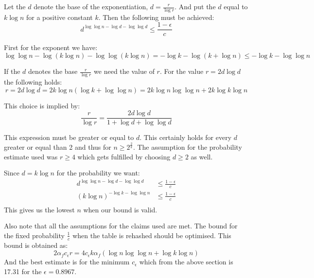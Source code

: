 Let the $d$ denote the base of the exponentiation, $d = \frac{r}{\log r}$. And put the $d$ equal to $k \log n$ for a positive constant $k$. Then the following must be achieved:
\begin{displaymath}
d ^ {\log \log n - \log d -\log \log d} \leq \frac{1 - \epsilon}{c}
\end{displaymath}

First for the exponent we have:
\begin{displaymath}
\log \log n - \log (k \log n) - \log \log (k \log n) = - \log k - \log (k + \log n) \leq -\log k - \log \log n
\end{displaymath}

If the $d$ denotes the base $\frac{r}{\log r}$ we need the value of $r$. For the value $r = 2 d \log d$ the following holds:
\begin{displaymath}
r = 2 d \log d = 2 k \log n (\log k + \log \log n) = 2 k \log n \log \log n + 2 k \log k \log n
\end{displaymath}

This choice is implied by:
\begin{displaymath}
\frac{r}{\log r} = \frac{2 d \log d}{1 + \log d + \log \log d}
\end{displaymath}

This expression must be greater or equal to $d$. This certainly holds for every $d$ greater or equal than 2 and thus for $n \geq 2 ^ \frac{2}{k}$. The assumption for the probability estimate used was $r \geq 4$ which gets fulfilled by choosing $d \geq 2$ as well.

Since $d = k \log n$ for the probability we want:
\begin{displaymath}
\begin{split}
d ^ {\log \log n - \log d -\log \log d} & \leq \frac{1 - \epsilon}{c} \\
\left(k \log n\right)^{-\log k -\log \log n} & \leq \frac{1 - \epsilon}{c} \\
\end{split}
\end{displaymath}
This gives us the lowest $n$ when our bound is valid. 

Also note that all the assumptions for the claims used are met. The bound for the fixed probability $\frac{1}{c}$ when the table is rehashed should be optimised. This bound is obtained as:
\begin{displaymath}
2 \alpha_f c_\epsilon r = 4 c_\epsilon k \alpha_f (\log n \log \log n + \log k \log n)
\end{displaymath}
And the best estimate is for the minimum $c_\epsilon$ which from the above section is 17.31 for the $\epsilon = 0.8967$.

